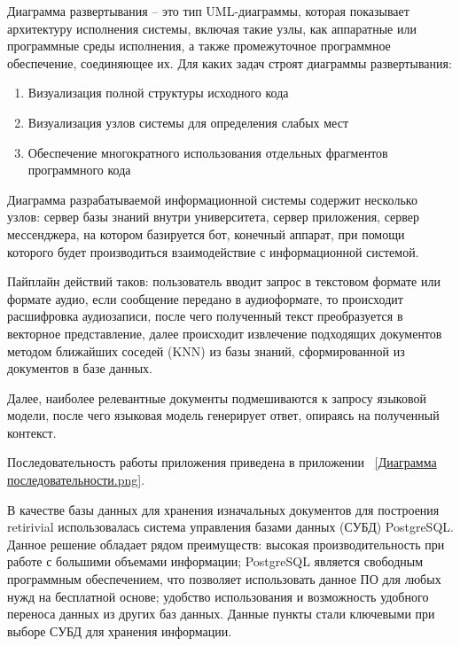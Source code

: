 Диаграмма развертывания – это тип UML-диаграммы, которая показывает архитектуру
исполнения системы, включая такие узлы, как аппаратные или программные среды
исполнения, а также промежуточное программное обеспечение, соединяющее их. 
Для каких задач строят диаграммы развертывания:

\begin{enumerate}
    \item Визуализация полной структуры исходного кода
    \item Визуализация узлов системы для определения слабых мест
    \item Обеспечение многократного использования отдельных фрагментов
        программного кода
\end{enumerate}

Диаграмма разрабатываемой информационной системы содержит несколько узлов: 
сервер базы знаний внутри университета, сервер приложения, сервер мессенджера,
на котором базируется бот, конечный аппарат, при помощи которого будет 
производиться взаимодействие с информационной системой.




Пайплайн действий таков: пользователь вводит запрос в текстовом формате или 
формате аудио, если сообщение передано в аудиоформате, то происходит 
расшифровка аудиозаписи, после чего полученный текст преобразуется в векторное
представление, далее происходит извлечение подходящих документов методом
ближайших соседей (KNN) из базы знаний, сформированной из документов в базе 
данных.

Далее, наиболее релевантные документы подмешиваются к запросу языковой модели,
после чего языковая модель генерирует ответ, опираясь на полученный контекст.

Последовательность работы приложения приведена в приложении
~\ref{Диаграмма последовательности.png}.


В качестве базы данных для хранения изначальных документов для построения 
retirivial использовалась система управления базами данных (СУБД) PostgreSQL\@.
Данное решение обладает рядом преимуществ: высокая производительность при 
работе с большими объемами информации; PostgreSQL является свободным 
программным обеспечением, что позволяет использовать данное ПО для любых 
нужд на бесплатной основе; удобство использования и возможность удобного 
переноса данных из других баз данных. Данные пункты стали ключевыми при выборе 
СУБД для хранения информации. 

